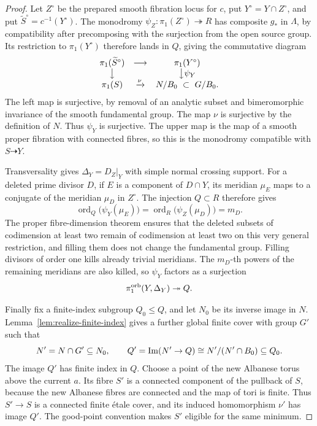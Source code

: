 \begin{proof}
Let \(Z^\circ\) be the prepared smooth fibration locus for \(c\), put
\(Y^\circ=Y\cap Z^\circ\), and put
\(\widetilde S^\circ=c^{-1}(Y^\circ)\). The monodromy
\(\psi_Z:\pi_1(Z^\circ)\twoheadrightarrow R\) has composite
\(g_*\) in \(\Lambda\), by compatibility after precomposing with
the surjection from the open source group. Its restriction to
\(\pi_1(Y^\circ)\) therefore lands in \(Q\), giving the
commutative diagram
\[
\begin{array}{ccc}
 \pi_1(\widetilde S^\circ)&\longrightarrow&\pi_1(Y^\circ)\\
 \big\downarrow&&\big\downarrow\psi_Y\\
 \pi_1(S)&\xrightarrow{\nu}&N/B_0\ \subset\ G/B_0 .
\end{array}
\]
The left map is surjective, by removal of an analytic subset and
bimeromorphic invariance of the smooth fundamental group.
The map \(\nu\) is surjective by the definition of \(N\).
Thus \(\psi_Y\) is surjective. The upper map is the map of a
smooth proper fibration with connected fibres, so this is the
monodromy compatible with \(S\dashrightarrow Y\).

Transversality gives \(\Delta_Y=D_Z|_Y\) with simple normal
crossing support. For a deleted prime divisor \(D\), if \(E\) is a
component of \(D\cap Y\), its
meridian \(\mu_E\) maps to a conjugate of the meridian \(\mu_D\)
in \(Z^\circ\). The injection \(Q\subset R\) therefore gives
\[
 \operatorname{ord}_Q\bigl(\psi_Y(\mu_E)\bigr)
 =\operatorname{ord}_R\bigl(\psi_Z(\mu_D)\bigr)=m_D.
\]
The proper fibre-dimension theorem ensures that the deleted subsets
of codimension at least two remain of codimension at least two on
this very general restriction, and
filling them does not change the fundamental group. Filling
divisors of order one kills already trivial meridians. The
\(m_D\)-th powers of the remaining meridians are also killed,
so \(\psi_Y\) factors as a surjection
\[
 \pi_1^{\mathrm{orb}}(Y,\Delta_Y)\twoheadrightarrow Q.
\]

Finally fix a finite-index subgroup \(Q_0\le Q\), and let \(N_0\)
be its inverse image in \(N\). Lemma~\ref{lem:realize-finite-index}
gives a further global finite cover with group \(G'\) such that
\[
 N'=N\cap G'\subseteq N_0,\qquad
 Q'=\operatorname{Im}(N'\to Q)\cong N'/(N'\cap B_0)\subseteq Q_0.
\]
The image \(Q'\) has finite index in \(Q\). Choose a point of the
new Albanese torus above the current \(a\). Its fibre \(S'\) is a
connected component of the pullback of \(S\), because the new
Albanese fibres are connected and the map of tori is finite.
Thus \(S'\to S\) is a connected finite \'etale cover, and its
induced homomorphism \(\nu'\) has image \(Q'\). The good-point
convention makes \(S'\) eligible for the same minimum.


\end{proof}
